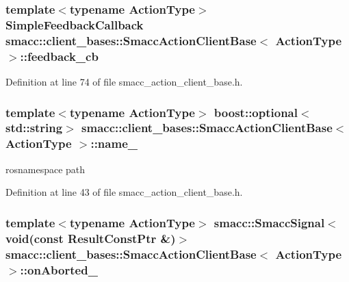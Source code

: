 \subsubsection[{\texorpdfstring{feedback\+\_\+cb}{feedback_cb}}]{\setlength{\rightskip}{0pt plus 5cm}template$<$typename Action\+Type$>$ {\bf Simple\+Feedback\+Callback} {\bf smacc\+::client\+\_\+bases\+::\+Smacc\+Action\+Client\+Base}$<$ Action\+Type $>$\+::feedback\+\_\+cb}\hypertarget{classsmacc_1_1client__bases_1_1SmaccActionClientBase_a978629b407530f1b7d266a009eff664b}{}\label{classsmacc_1_1client__bases_1_1SmaccActionClientBase_a978629b407530f1b7d266a009eff664b}


Definition at line 74 of file smacc\+\_\+action\+\_\+client\+\_\+base.\+h.

\subsubsection[{\texorpdfstring{name\+\_\+}{name_}}]{\setlength{\rightskip}{0pt plus 5cm}template$<$typename Action\+Type$>$ boost\+::optional$<$std\+::string$>$ {\bf smacc\+::client\+\_\+bases\+::\+Smacc\+Action\+Client\+Base}$<$ Action\+Type $>$\+::name\+\_\+}\hypertarget{classsmacc_1_1client__bases_1_1SmaccActionClientBase_a12b007d3c3657b0f0699e97cdb96a490}{}\label{classsmacc_1_1client__bases_1_1SmaccActionClientBase_a12b007d3c3657b0f0699e97cdb96a490}


rosnamespace path 



Definition at line 43 of file smacc\+\_\+action\+\_\+client\+\_\+base.\+h.

\subsubsection[{\texorpdfstring{on\+Aborted\+\_\+}{onAborted_}}]{\setlength{\rightskip}{0pt plus 5cm}template$<$typename Action\+Type$>$ {\bf smacc\+::\+Smacc\+Signal}$<$void(const Result\+Const\+Ptr \&)$>$ {\bf smacc\+::client\+\_\+bases\+::\+Smacc\+Action\+Client\+Base}$<$ Action\+Type $>$\+::on\+Aborted\+\_\+}\hypertarget{classsmacc_1_1client__bases_1_1SmaccActionClientBase_adc33748ca4fcef9730f8039b75d496d0}{}\label{classsmacc_1_1client__bases_1_1SmaccActionClientBase_adc33748ca4fcef9730f8039b75d496d0}


